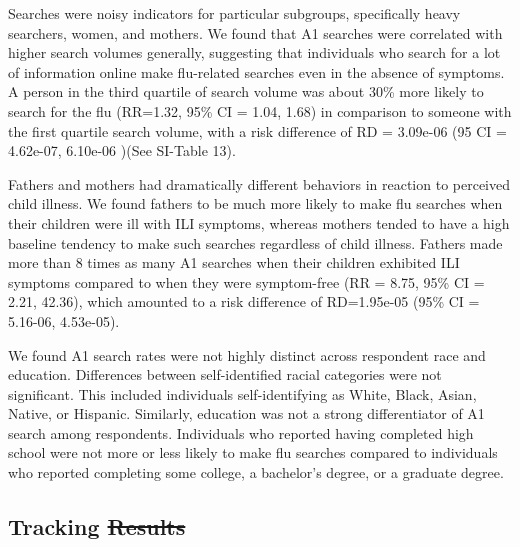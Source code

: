 \documentclass[fleqn,10pt]{wlscirep}
\providecommand{\DIFadd}[1]{{\protect\color{blue}\uwave{#1}}} %
\providecommand{\DIFdel}[1]{{\protect\color{red}\sout{#1}}}                      %
\providecommand{\DIFaddbegin}{} %
\providecommand{\DIFaddend}{} %
\providecommand{\DIFdelbegin}{} %
\providecommand{\DIFdelend}{} %
\begin{document}
Searches were noisy indicators for particular subgroups, specifically heavy searchers, women, and mothers. We found that A1 searches were correlated with higher search volumes generally, suggesting that individuals who search for a lot of information online make flu-related searches even in the absence of symptoms. A person in the third quartile of search volume was about 30\% more likely to search for the flu (RR=1.32, 95\% CI = 1.04, 1.68) in comparison to someone with the first quartile search volume, with a risk difference of RD = 3.09e-06 (95 CI = 4.62e-07, 6.10e-06 )(See SI-Table 13). 

Fathers and mothers had dramatically different behaviors in reaction to perceived child illness. We found fathers to be much more likely to make flu searches when their children were ill with ILI symptoms, whereas mothers tended to have a high baseline tendency to make such searches regardless of child illness. Fathers made more than 8 times as many A1 searches when their children exhibited ILI symptoms compared to when they were symptom-free (RR = 8.75, 95\% CI = 2.21, 42.36), which amounted to a risk difference of RD=1.95e-05 (95\% CI = 5.16-06, 4.53e-05).

We found A1 search rates were not highly distinct across respondent race and education. Differences between self-identified racial categories were not significant. This included individuals self-identifying as White, Black, Asian, Native, or Hispanic. Similarly, education was not a strong differentiator of A1 search among respondents. Individuals who reported having completed high school were not more or less likely to make flu searches compared to individuals who reported completing some college, a bachelor's degree, or a graduate degree. 

\subsection*{Tracking \DIFdelbegin \DIFdel{Results}\DIFdelend \DIFaddbegin \DIFadd{Model Performance}\DIFaddend }
\end{document}
